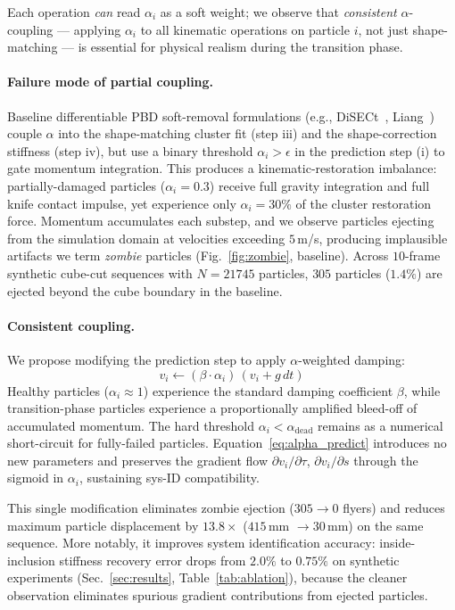 Each operation \emph{can} read $\alpha_i$ as a soft weight; we observe that
\emph{consistent} $\alpha$-coupling --- applying $\alpha_i$ to all kinematic
operations on particle $i$, not just shape-matching --- is essential for
physical realism during the transition phase.

\paragraph{Failure mode of partial coupling.}
Baseline differentiable PBD soft-removal formulations (e.g.,
DiSECt~\cite{diSECt2021}, Liang~\cite{liang2023}) couple $\alpha$ into
the shape-matching cluster fit (step iii) and the shape-correction stiffness
(step iv), but use a binary threshold $\alpha_i > \epsilon$ in the prediction
step (i) to gate momentum integration. This produces a kinematic-restoration
imbalance: partially-damaged particles ($\alpha_i = 0.3$) receive full
gravity integration and full knife contact impulse, yet experience only
$\alpha_i {=} 30\%$ of the cluster restoration force. Momentum accumulates
each substep, and we observe particles ejecting from the simulation domain
at velocities exceeding $5\,$m/s, producing implausible artifacts we term
\emph{zombie} particles (Fig.~\ref{fig:zombie}, baseline).
Across $10$-frame synthetic cube-cut sequences with $N{=}21745$ particles,
$305$ particles ($1.4\%$) are ejected beyond the cube boundary in the baseline.

\paragraph{Consistent coupling.}
We propose modifying the prediction step to apply $\alpha$-weighted damping:
\begin{equation}
v_i \leftarrow (\beta \cdot \alpha_i) \, (v_i + g\,dt)
\label{eq:alpha_predict}
\end{equation}
Healthy particles ($\alpha_i {\approx} 1$) experience the standard damping
coefficient $\beta$, while transition-phase particles experience a
proportionally amplified bleed-off of accumulated momentum. The hard
threshold $\alpha_i < \alpha_{\text{dead}}$ remains as a numerical
short-circuit for fully-failed particles. Equation~\eqref{eq:alpha_predict}
introduces no new parameters and preserves the gradient flow $\partial v_i /
\partial \tau$, $\partial v_i / \partial s$ through the sigmoid in $\alpha_i$,
sustaining sys-ID compatibility.

This single modification eliminates zombie ejection ($305 \to 0$ flyers) and
reduces maximum particle displacement by $13.8\times$ ($415\,$mm $\to 30\,$mm)
on the same sequence. More notably, it improves system identification
accuracy: inside-inclusion stiffness recovery error drops from $2.0\%$ to
$0.75\%$ on synthetic experiments (Sec.~\ref{sec:results},
Table~\ref{tab:ablation}), because the cleaner observation eliminates
spurious gradient contributions from ejected particles.

